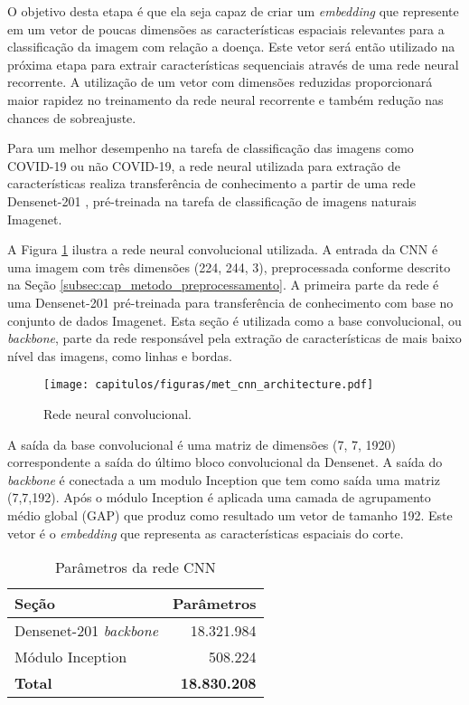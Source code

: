 O objetivo desta etapa é que ela seja capaz de criar um \textit{embedding} que represente em um vetor de poucas dimensões as características espaciais relevantes para a classificação da imagem com relação a doença. Este vetor será então utilizado na próxima etapa para extrair características sequenciais através de uma rede neural recorrente.  A utilização de um vetor com dimensões reduzidas proporcionará maior rapidez no treinamento da rede neural recorrente e também redução nas chances de sobreajuste.

Para um melhor desempenho na tarefa de classificação das imagens como COVID-19 ou não COVID-19, a rede neural utilizada para extração de características realiza transferência de conhecimento a partir de uma rede Densenet-201 \cite{huang2017densely}, pré-treinada na tarefa de classificação de imagens naturais Imagenet. 

A Figura \ref{fig:met_rede_cnn} ilustra a rede neural convolucional utilizada. A entrada da CNN é uma imagem com três dimensões (224, 244, 3), preprocessada conforme descrito na Seção \ref{subsec:cap_metodo_preprocessamento}. A primeira parte da rede é uma Densenet-201 pré-treinada para transferência de conhecimento com base no conjunto de dados Imagenet. Esta seção é utilizada como a base convolucional, ou \textit{backbone}, parte da rede responsável pela extração de características de mais baixo nível das imagens, como linhas e bordas.

\begin{figure}[!ht]
\centering
\texttt{[image: capitulos/figuras/met\_cnn\_architecture.pdf]}
\caption{Rede neural convolucional.}
\label{fig:met_rede_cnn}
\end{figure}

A saída da base convolucional é uma matriz de dimensões (7, 7, 1920) correspondente a saída do último bloco convolucional da Densenet. A saída do \textit{backbone} é conectada a um modulo Inception \cite{szegedy2017inception} que tem como saída uma matriz (7,7,192). Após o módulo Inception é aplicada uma camada de agrupamento médio global (GAP) que produz como resultado um vetor de tamanho 192.  Este vetor é o \textit{embedding} que representa as características espaciais do corte.

\begin{table}[]
\centering
\caption{Parâmetros da rede CNN}
\label{table:met_pesos_cnn}
\begin{tabular}{lr}
\hline
Seção                          & \multicolumn{1}{l}{Parâmetros} \\ \hline
Densenet-201 \textit{backbone} & 18.321.984                     \\
Módulo Inception               & 508.224                        \\
\textbf{Total}                 & \textbf{18.830.208}            \\ \hline
\end{tabular}
\end{table}

